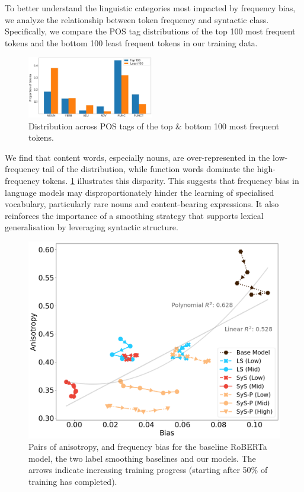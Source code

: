 To better understand the linguistic categories most impacted by frequency bias, we analyze the relationship between token frequency and syntactic class. Specifically, we compare the POS tag distributions of the top 100 most frequent tokens and the bottom 100 least frequent tokens in our training data. 

\begin{figure}
    \centering
    \includegraphics[width=0.49\textwidth]{chapters/syntatic-smoothing/figures/top_versus_bottom_pos_dist.pdf}
    \caption{Distribution across POS tags of the top \& bottom 100 most frequent tokens.}
    \label{fig:top-100-pos-dist}
\end{figure}


We find that content words, especially nouns, are over-represented in the low-frequency tail of the distribution, while function words dominate the high-frequency tokens. \cref{fig:top-100-pos-dist} illustrates this disparity. This suggests that frequency bias in language models may disproportionately hinder the learning of specialised vocabulary, particularly rare nouns and content-bearing expressions. It also reinforces the importance of a smoothing strategy that supports lexical generalisation by leveraging syntactic structure.


\begin{figure}[ht!]
    \centering
    \includegraphics[width=0.75\linewidth]{chapters/syntatic-smoothing/figures/bias-vs-anisotropy.png}
    \caption{Pairs of anisotropy, and frequency bias for the baseline RoBERTa model, the two label smoothing baselines and our \smoothing models. The arrows indicate increasing training progress (starting after 50\% of training has completed).}
    \label{fig:bias-anisotropy-correlation}
\end{figure}

